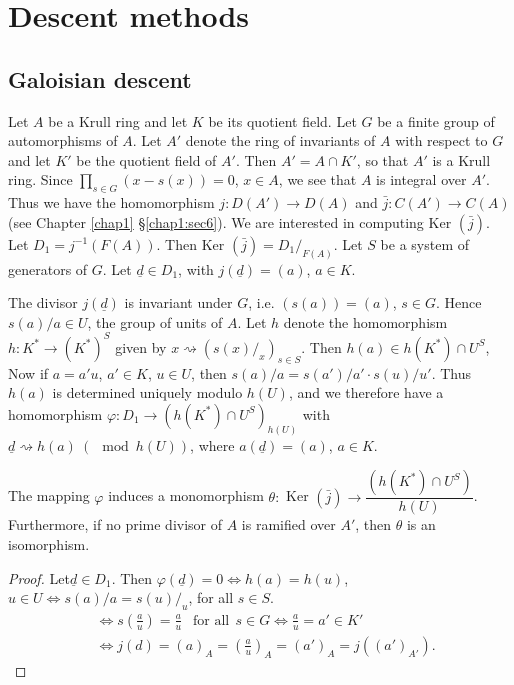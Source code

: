\chapter{Descent methods}\label{chap3}%

\section{Galoisian descent}\label{chap3:sec1}\pageoriginale%
 
 Let $A$ be a Krull ring and let $K$ be its quotient field. Let $G$ be
 a finite group of automorphisms of $A$. Let $A'$ denote the ring of
 invariants of $A$ with respect to $G$ and let $K'$ be the quotient
 field of $A'$. Then $A'= A \cap K'$, so that $A'$ is a Krull
 ring. Since $\prod\limits_{s\in G} (x-s(x)) = 0$, $x \in A$, we see that $A$
 is integral over $A'$. Thus  we have the homomorphism $j : D (A')
 \rightarrow D(A)$ and $\bar{j} : C(A') \rightarrow C(A)$ (see Chapter
 \ref{chap1} \S \ref{chap1:sec6}). We are interested in
 computing Ker $(\bar{j})$. Let $D_1 = 
 j^{-1} (F(A))$. Then Ker $(\bar{j}) = D_1/_{F(A)}$. Let $S$ be a
 system of  generators of $G$. Let $\underline{d} \in D_1$, with  $j
 (\underline{d}) = (a)$, $a \in K$. 
    
\noindent
The divisor $j(\underline{d})$ is invariant under $G$, i.e. $(s(a)) =
(a)$, $s \in G$. Hence $s(a) /a \in U$, the group of units of
$A$. Let $h$ denote the homomorphism $h : K^* \rightarrow (K^* )^S$
given by $x \rightsquigarrow (s(x){/_{x}})_{s \in S}$. Then $h(a) \in
h(K^*) \cap U^S$, Now if $a = a' u$, $a' \in K$, $u \in U$, then
$s(a)/{a}= s(a')/{a'} \cdot s(u)/{u'}$. Thus $h(a)$ is determined
uniquely modulo $h(U)$, and we therefore have a homomorphism $\varphi
: D_1 \rightarrow (h (K^*) \cap U^S)_{h(U)}$ with $\underline{d}
\rightsquigarrow h(a) ~ (\mod h(U))$, where $a (\underline{d}) = (a)$,
$a \in K$. 
   
\begin{theorem}\label{chap3:thm1.1} %
The mapping $\varphi$ induces a monomorphism $\theta : $ Ker
  $(\bar{j}) \rightarrow \dfrac{(h(K^*) \cap U^S)}{h(U)}$. Furthermore,
  if no prime divisor of $A$ is ramified over $A'$, then $\theta$ is an
  isomorphism. 
\end{theorem}  
      
\begin{proof}
Let\pageoriginale $\underline{d} \in D_1$. Then
$\varphi(\underline{d}) = 0 
\Leftrightarrow h(a) = h(u)$, $u \in U \Leftrightarrow s (a) /{a} =
s(u){/_{u}}$, for all $s \in S$. 
    \begin{align*}
& \Leftrightarrow s(\frac{a}{u}) = \frac{a}{u} ~~\text { for all} ~~s
      \in G \Leftrightarrow \frac{a}{u} = a' \in K'\\ 
& \Leftrightarrow j (d) = (a)_A = (\frac{a}{u})_A = (a')_A =
      j((a')_{A'}). 
    \end{align*}    
    \end{proof}

